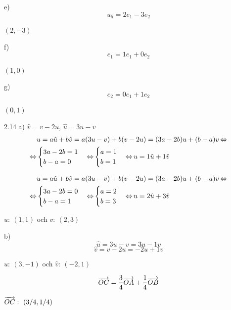 \begin{task}{e)}
	\[u_5=2e_1-3e_2\]
	
	\ans $(2,-3)$
\end{task}

\begin{task}{f)}
	\[e_1=1e_1+0e_2\]
	
	\ans $(1,0)$
\end{task}

\begin{task}{g)}
	\[e_2=0e_1+1e_2\]
	
	\ans $(0,1)$
\end{task}

\begin{task}{2.14 a)}
	$\hat{v}=v-2u$, $\hat{u}=3u-v$
	\begin{align*}
		&u=a\hat{u}+b\hat{v}=
		a(3u-v)+b(v-2u)=
		(3a-2b)u+(b-a)v \operatorname{\Leftrightarrow} \\ \operatorname{\Leftrightarrow}
		&\begin{cases}
			3a-2b=1 \\
			b-a=0
		\end{cases} \operatorname{\Leftrightarrow}
		\begin{cases}
			a=1 \\ 
			b=1
		\end{cases} \operatorname{\Leftrightarrow}
		u=1\hat{u}+1\hat{v}
	\end{align*}
	
	\begin{align*}
		&u=a\hat{u}+b\hat{v}=
		a(3u-v)+b(v-2u)=
		(3a-2b)u+(b-a)v \operatorname{\Leftrightarrow} \\ \operatorname{\Leftrightarrow}
		&\begin{cases}
			3a-2b=0 \\
			b-a=1
		\end{cases} \operatorname{\Leftrightarrow}
		\begin{cases}
			a=2 \\ 
			b=3
		\end{cases} \operatorname{\Leftrightarrow}
		u=2\hat{u}+3\hat{v}
	\end{align*}
	
	\ans $u:~(1,1)$ och $v:~(2,3)$
\end{task}

\begin{task}{b)}
	\[\hat{u}=3u-v=3u-1v\]
	\[\hat{v}=v-2u=-2u+1v\]
	
	\ans $\hat{u}:~(3,-1)$ och $\hat{v}:~(-2,1)$
\end{task}

\begin{task}{2.15}
	\[\overrightarrow{OC}=\frac{3}{4}\overrightarrow{OA}+\frac{1}{4}\overrightarrow{OB}\]
	
	\ans $\overrightarrow{OC}:~(3/4,1/4)$
\end{task}

